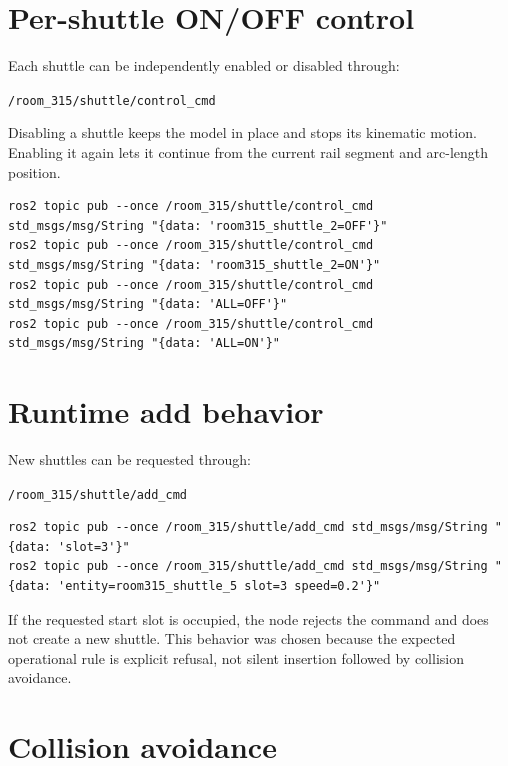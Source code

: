 \documentclass[12pt,a4paper]{report}
\newcommand{\codenext}[1]{\par\Needspace{#1\baselineskip}}
\begin{document}
\section{Per-shuttle ON/OFF control}

Each shuttle can be independently enabled or disabled through:

\begin{center}
\texttt{/room\_315/shuttle/control\_cmd}
\end{center}

Disabling a shuttle keeps the model in place and stops its kinematic motion.
Enabling it again lets it continue from the current rail segment and
arc-length position.

\codenext{8}
\begin{lstlisting}[style=terminalcode,caption={Per-shuttle enable and disable commands.}]
ros2 topic pub --once /room_315/shuttle/control_cmd std_msgs/msg/String "{data: 'room315_shuttle_2=OFF'}"
ros2 topic pub --once /room_315/shuttle/control_cmd std_msgs/msg/String "{data: 'room315_shuttle_2=ON'}"
ros2 topic pub --once /room_315/shuttle/control_cmd std_msgs/msg/String "{data: 'ALL=OFF'}"
ros2 topic pub --once /room_315/shuttle/control_cmd std_msgs/msg/String "{data: 'ALL=ON'}"
\end{lstlisting}

\section{Runtime add behavior}

New shuttles can be requested through:

\begin{center}
\texttt{/room\_315/shuttle/add\_cmd}
\end{center}

\codenext{8}
\begin{lstlisting}[style=terminalcode,caption={Runtime shuttle add commands.}]
ros2 topic pub --once /room_315/shuttle/add_cmd std_msgs/msg/String "{data: 'slot=3'}"
ros2 topic pub --once /room_315/shuttle/add_cmd std_msgs/msg/String "{data: 'entity=room315_shuttle_5 slot=3 speed=0.2'}"
\end{lstlisting}

If the requested start slot is occupied, the node rejects the command and does
not create a new shuttle. This behavior was chosen because the expected
operational rule is explicit refusal, not silent insertion followed by
collision avoidance.

\section{Collision avoidance}
\end{document}
